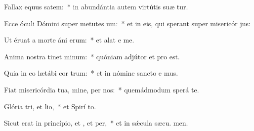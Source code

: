 \item Fallax equus  satem:~* in abundántia autem virtútis suæ  tur.
\item Ecce óculi Dómini super metutes um:~* et in eis, qui sperant super misericór jus:
\item Ut éruat a morte áni erum:~* et alat e  me.
\item Anima nostra tinet minum:~* quóniam adjútor et pro  est.
\item Quia in eo lætábi cor trum:~* et in nómine sancto e mus.
\item Fiat misericórdia tua, mine, per nos:~* quemádmodum sperá  te.
\item Glória tri, et lio,~* et Spirí to.
\item Sicut erat in princípio, et , et per,~* et in sǽcula sæcu. men.
